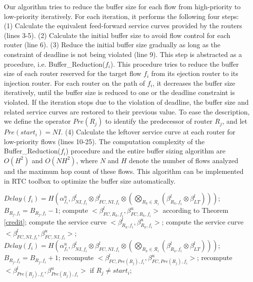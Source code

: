 \documentclass[preprint]{elsarticle}
\begin{document}
Our algorithm tries to reduce the buffer size for each flow from high-priority to low-priority iteratively. For each iteration, it performs the following four steps: (1) Calculate the equivalent feed-forward service curves provided by the routers (lines 3-5). (2) Calculate the initial buffer size to avoid flow control for each router (line 6). (3) Reduce the initial buffer size gradually as long as the constraint of deadline is not being violated (line 9). This step is abstracted as a procedure, i.e. Buffer\_Reduction($f_i$). This procedure tries to reduce the buffer size of each router reserved for the target flow $f_i$ from its ejection router to its injection router. For each router on the path of $f_i$, it decreases the buffer size iteratively, until the buffer size is reduced to one or the deadline constraint is violated. If the iteration stops due to the violation of deadline, the buffer size and related service curves are restored to their previous value. To ease the description, we define the operator $Pre(R_j)$ to identify the predecessor of router $R_j$, and let $Pre(start_i)=NI$. (4) Calculate the leftover service curve at each router for low-priority flows (lines 10-25). The computation complexity of the Buffer\_Reduction($f_i$) procedure and the entire buffer sizing algorithm are $O(H^2)$ and $O(NH^2)$, where $N$ and $H$ denote the number of flows analyzed and the maximum hop count of these flows. This algorithm can be implemented in RTC toolbox \cite{rtc} to optimize the buffer size automatically.
\begin{algorithm}
\begin{algorithmic}[1]
            \State $Delay(f_i)=H(\alpha_{f_i}^u,\beta_{NI,f_i}^l\otimes\beta^l_{FC,NI,f_i}\otimes (\underset{R_k\in\mathcal{R}_{i}}{\bigotimes}(\beta^l_{R_k,f_i}\otimes\beta^l_{LT})))$;
                \State $B_{R_j,f_i}=B_{R_j,f_i}-1$;
                    \State compute $<\beta_{FC,R_k,f_i}^l,\beta_{FC,R_k,f_i}^u>$ according to Theorem \ref{credit};
                    \State compute the service curve $<\beta_{R_k,f_i}^l,\beta_{R_k,f_i}^u>$;
                \EndFor
                \State compute the service curve $<\beta_{FC,NI,f_i}^l,\beta_{FC,NI,f_i}^u>$;
                \State $Delay(f_i)=H(\alpha_{f_i}^u,\beta_{NI,f_i}^l\otimes\beta^l_{FC,NI,f_i}\otimes (\underset{R_k\in\mathcal{R}_{i}}{\bigotimes}(\beta^l_{R_k,f_i}\otimes\beta^l_{LT})))$;
            \EndWhile
                \State $B_{R_j,f_i}=B_{R_j,f_i}+1$;
                \State recompute $<\beta_{FC,Pre(R_j),f_i}^l,\beta_{FC,Pre(R_j),f_i}^u>$;
                \State recompute $<\beta_{Pre(R_j),f_i}^l,\beta_{Pre(R_j),f_i}^u>$ if $R_j\neq start_i$;
            \EndIf
        \EndFor
\EndProcedure
\end{algorithmic}
\end{algorithm}
\end{document}
